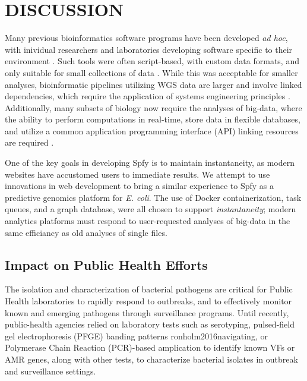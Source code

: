 \documentclass[a4,center,fleqn]{NAR}
\begin{document}


\section{DISCUSSION}

Many previous bioinformatics software programs have been developed \textit{ad hoc}, with inividual researchers and laboratories developing software specific to their environment \cite{de2015trends}.
Such tools were often script-based, with custom data formats, and only suitable for small collections of data \cite{de2015trends}.
While this was acceptable for smaller analyses, bioinformatic pipelines utilizing WGS data are larger and involve linked dependencies, which require the application of systems engineering principles \cite{schatz2015biological}.
Additionally, many subsets of biology now require the analyses of big-data, where the ability to perform computations in real-time, store data in flexible databases, and utilize a common application programming interface (API) linking resources are required \cite{swaminathan2016review}.

One of the key goals in developing Spfy is to maintain instantaneity, as modern websites have accustomed users to immediate results.
We attempt to use innovations in web development to bring a similar experience to Spfy as a predictive genomics platform for \textit{E. coli}.
The use of Docker containerization, task queues, and a graph database, were all chosen to support \textit{instantaneity}; modern analytics platforms must respond to user-requested analyses of big-data in the same efficiancy as old analyses of single files.

\subsection{Impact on Public Health Efforts}

The isolation and characterization of bacterial pathogens are critical for Public Health laboratories to rapidly respond to outbreaks, and to effectively monitor known and emerging pathogens through surveillance programs.
Until recently, public-health agencies relied on laboratory tests such as serotyping, pulsed-field gel electrophoresis (PFGE) banding patterns {ronholm2016navigating}, or Polymerase Chain Reaction (PCR)-based amplication to identify known VFs or AMR genes, along with other tests, to characterize bacterial isolates in outbreak and surveillance settings.
\end{document}
